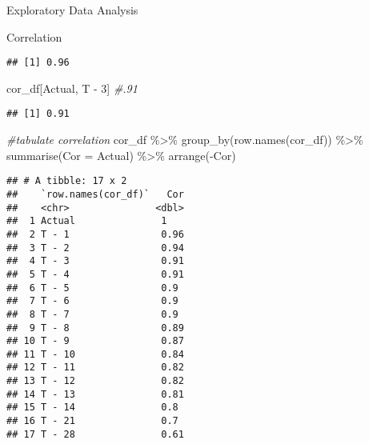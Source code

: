 \documentclass[
  ignorenonframetext,
]{beamer}
\newenvironment{Shaded}{\begin{snugshade}}{\end{snugshade}}
\newcommand{\AttributeTok}[1]{\textcolor[rgb]{0.77,0.63,0.00}{#1}}
\newcommand{\CommentTok}[1]{\textcolor[rgb]{0.56,0.35,0.01}{\textit{#1}}}
\newcommand{\FunctionTok}[1]{\textcolor[rgb]{0.00,0.00,0.00}{#1}}
\newcommand{\NormalTok}[1]{#1}
\newcommand{\SpecialCharTok}[1]{\textcolor[rgb]{0.00,0.00,0.00}{#1}}
\newcommand{\StringTok}[1]{\textcolor[rgb]{0.31,0.60,0.02}{#1}}
\begin{document}
\begin{frame}[fragile]{Exploratory Data Analysis}
\begin{block}{Correlation}
\begin{verbatim}
## [1] 0.96
\end{verbatim}

\begin{Shaded}
\begin{Highlighting}[]
\NormalTok{cor\_df[}\StringTok{\textquotesingle{}Actual\textquotesingle{}}\NormalTok{, }\StringTok{\textquotesingle{}T {-} 3\textquotesingle{}}\NormalTok{] }\CommentTok{\#.91}
\end{Highlighting}
\end{Shaded}

\begin{verbatim}
## [1] 0.91
\end{verbatim}

\begin{Shaded}
\begin{Highlighting}[]
\CommentTok{\#tabulate correlation}
\NormalTok{cor\_df }\SpecialCharTok{\%\textgreater{}\%} 
  \FunctionTok{group\_by}\NormalTok{(}\FunctionTok{row.names}\NormalTok{(cor\_df)) }\SpecialCharTok{\%\textgreater{}\%} 
  \FunctionTok{summarise}\NormalTok{(}\AttributeTok{Cor =}\NormalTok{ Actual) }\SpecialCharTok{\%\textgreater{}\%} 
  \FunctionTok{arrange}\NormalTok{(}\SpecialCharTok{{-}}\NormalTok{Cor)}
\end{Highlighting}
\end{Shaded}

\begin{verbatim}
## # A tibble: 17 x 2
##    `row.names(cor_df)`   Cor
##    <chr>               <dbl>
##  1 Actual               1   
##  2 T - 1                0.96
##  3 T - 2                0.94
##  4 T - 3                0.91
##  5 T - 4                0.91
##  6 T - 5                0.9 
##  7 T - 6                0.9 
##  8 T - 7                0.9 
##  9 T - 8                0.89
## 10 T - 9                0.87
## 11 T - 10               0.84
## 12 T - 11               0.82
## 13 T - 12               0.82
## 14 T - 13               0.81
## 15 T - 14               0.8 
## 16 T - 21               0.7 
## 17 T - 28               0.61
\end{verbatim}
\end{block}
\end{frame}
\end{document}
